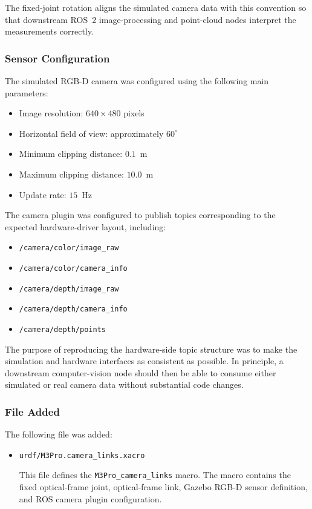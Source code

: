 \documentclass{article}
\begin{document}
The fixed-joint rotation aligns the simulated camera data with this convention so that downstream ROS~2 image-processing and point-cloud nodes interpret the measurements correctly.

\subsubsection{Sensor Configuration}

The simulated RGB-D camera was configured using the following main parameters:

\begin{itemize}
    \item Image resolution: $640 \times 480$ pixels
    \item Horizontal field of view: approximately $60^\circ$
    \item Minimum clipping distance: $0.1$~m
    \item Maximum clipping distance: $10.0$~m
    \item Update rate: $15$~Hz
\end{itemize}

The camera plugin was configured to publish topics corresponding to the expected hardware-driver layout, including:

\begin{itemize}
    \item \texttt{/camera/color/image\_raw}
    \item \texttt{/camera/color/camera\_info}
    \item \texttt{/camera/depth/image\_raw}
    \item \texttt{/camera/depth/camera\_info}
    \item \texttt{/camera/depth/points}
\end{itemize}

The purpose of reproducing the hardware-side topic structure was to make the simulation and hardware interfaces as consistent as possible. In principle, a downstream computer-vision node should then be able to consume either simulated or real camera data without substantial code changes.

\subsubsection{File Added}

The following file was added:

\begin{itemize}
    \item \texttt{urdf/M3Pro.camera\_links.xacro}

    This file defines the \texttt{M3Pro\_camera\_links} macro. The macro contains the fixed optical-frame joint, optical-frame link, Gazebo RGB-D sensor definition, and ROS camera plugin configuration.
\end{itemize}
\end{document}
